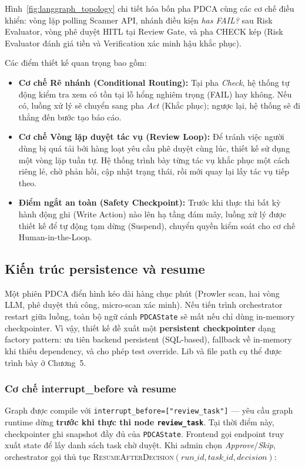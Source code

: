 

Hình~\ref{fig:langgraph_topology} chi tiết hóa bốn pha PDCA cùng các cơ chế điều khiển: vòng lặp polling Scanner API, nhánh điều kiện \textit{has FAIL?} sau Risk Evaluator, vòng phê duyệt HITL tại Review Gate, và pha CHECK kép (Risk Evaluator đánh giá tiền và Verification xác minh hậu khắc phục).

Các điểm thiết kế quan trọng bao gồm:
\begin{itemize}
  \item \textbf{Cơ chế Rẽ nhánh (Conditional Routing):} Tại pha \textit{Check}, hệ thống tự động kiểm tra xem có tồn tại lỗ hổng nghiêm trọng (FAIL) hay không. Nếu có, luồng xử lý sẽ chuyển sang pha \textit{Act} (Khắc phục); ngược lại, hệ thống sẽ đi thẳng đến bước tạo báo cáo.

  \item \textbf{Cơ chế Vòng lặp duyệt tác vụ (Review Loop):} Để tránh việc người dùng bị quá tải bởi hàng loạt yêu cầu phê duyệt cùng lúc, thiết kế sử dụng một vòng lặp tuần tự. Hệ thống trình bày từng tác vụ khắc phục một cách riêng lẻ, chờ phản hồi, cập nhật trạng thái, rồi mới quay lại lấy tác vụ tiếp theo.

  \item \textbf{Điểm ngắt an toàn (Safety Checkpoint):} Trước khi thực thi bất kỳ hành động ghi (Write Action) nào lên hạ tầng đám mây, luồng xử lý được thiết kế để tự động tạm dừng (Suspend), chuyển quyền kiểm soát cho cơ chế Human-in-the-Loop.
\end{itemize}

\subsection{Kiến trúc persistence và resume}
\label{subsec:persistence_resume}

Một phiên PDCA điển hình kéo dài hàng chục phút (Prowler scan, hai vòng LLM, phê duyệt thủ công, micro-scan xác minh). Nếu tiến trình orchestrator restart giữa luồng, toàn bộ ngữ cảnh \texttt{PDCAState} sẽ mất nếu chỉ dùng in-memory checkpointer. Vì vậy, thiết kế đề xuất một \textbf{persistent checkpointer} dạng factory pattern: ưu tiên backend persistent (SQL-based), fallback về in-memory khi thiếu dependency, và cho phép test override. Lib và file path cụ thể được trình bày ở Chương~5.

\subsubsection*{Cơ chế interrupt\_before và resume}
Graph được compile với \texttt{interrupt\_before=["review\_task"]} — yêu cầu graph runtime dừng \textbf{trước khi thực thi node \texttt{review\_task}}. Tại thời điểm này, checkpointer ghi snapshot đầy đủ của \texttt{PDCAState}. Frontend gọi endpoint truy xuất state để lấy danh sách task chờ duyệt. Khi admin chọn \textit{Approve}/\textit{Skip}, orchestrator gọi thủ tục \textsc{ResumeAfterDecision}$(run\_id, task\_id, decision)$:

